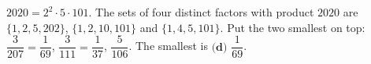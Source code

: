 $2020=2^2\cdot5\cdot101$. The sets of four distinct factors with product $2020$ are $\{1,2,5,202\}$, $\{1,2,10,101\}$ and $\{1,4,5,101\}$. Put the two smallest on top: $\dfrac3{207}=\dfrac1{69}$, $\dfrac3{111}=\dfrac1{37}$, $\dfrac5{106}$. The smallest is $\boxed{\textbf{(d) }\dfrac1{69}}$.
